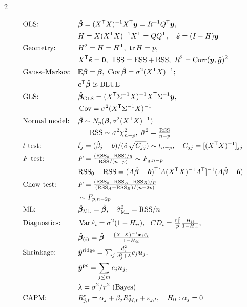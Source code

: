 \begin{paracol}{2}
\begin{keyformulas}
\begin{align*}
&\text{OLS:} && \hat{\bm\beta}=(X\T X)^{-1}X\T\bm y=R^{-1}Q\T\bm y,\\
  &&& H=X(X\T X)^{-1}X\T=QQ\T,\quad \hat{\bm\varepsilon}=(I-H)\bm y\\
&\text{Geometry:} && H^2=H=H\T,\ \tr H=p,\\
  &&& X\T\hat{\bm\varepsilon}=\bm 0,\ \text{TSS}=\text{ESS}+\text{RSS},\ R^2=\Corr(\bm y,\hat{\bm y})^2\\
&\text{Gauss--Markov:} && \E\hat{\bm\beta}=\bm\beta,\ \Cov\hat{\bm\beta}=\sigma^2(X\T X)^{-1};\\
  &&& \bm c\T\hat{\bm\beta}\ \text{is BLUE}\\
&\text{GLS:} && \hat{\bm\beta}_{\text{GLS}}=(X\T\Sigma^{-1}X)^{-1}X\T\Sigma^{-1}\bm y,\\
  &&& \Cov=\sigma^2(X\T\Sigma^{-1}X)^{-1}\\
&\text{Normal model:} && \hat{\bm\beta}\sim N_p(\bm\beta,\sigma^2(X\T X)^{-1})\\
  &&& \perp\!\!\!\perp\text{RSS}\sim\sigma^2\chi^2_{n-p},\ \hat\sigma^2=\tfrac{\text{RSS}}{n-p}\\
&t\text{ test:} && \hat t_j=(\hat\beta_j-b)/(\hat\sigma\sqrt{C_{jj}})\sim t_{n-p},\quad C_{jj}=[(X\T X)^{-1}]_{jj}\\
&F\text{ test:} && F=\tfrac{(\text{RSS}_0-\text{RSS})/q}{\text{RSS}/(n-p)}\sim F_{q,n-p}\\
&&& \text{RSS}_0-\text{RSS}=(A\hat{\bm\beta}-\bm b)\T[A(X\T X)^{-1}A\T]^{-1}(A\hat{\bm\beta}-\bm b)\\
&\text{Chow test:} && F=\tfrac{(\text{RSS}_0-\text{RSS}_A-\text{RSS}_B)/p}{(\text{RSS}_A+\text{RSS}_B)/(n-2p)}\\
  &&& \sim F_{p,n-2p}\\
&\text{ML:} && \hat{\bm\beta}_{\text{ML}}=\hat{\bm\beta},\quad \hat\sigma^2_{\text{ML}}=\text{RSS}/n\\
&\text{Diagnostics:} && \Var\hat\varepsilon_i=\sigma^2(1-H_{ii}),\ \ CD_i=\tfrac{r_i^2}{p}\tfrac{H_{ii}}{1-H_{ii}},\\
  &&& \hat{\bm\beta}_{(i)}=\hat{\bm\beta}-\tfrac{(X\T X)^{-1}\bm x_i\hat\varepsilon_i}{1-H_{ii}}\\
&\text{Shrinkage:} && \hat{\bm y}^{\text{ridge}}=\textstyle\sum_j\frac{d_j^2}{d_j^2+\lambda}c_j\bm u_j,\\
  &&& \hat{\bm y}^{\text{pc}}=\sum_{j\le m}c_j\bm u_j,\\
  &&& \lambda=\sigma^2/\tau^2\ \text{(Bayes)}\\
&\text{CAPM:} && R^*_{j,t}=\alpha_j+\beta_jR^*_{M,t}+\varepsilon_{j,t},\quad H_0:\alpha_j=0
\end{align*}
\end{keyformulas}


\end{paracol}
